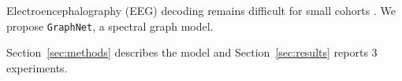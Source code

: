 Electroencephalography (EEG) decoding remains difficult for small cohorts \citep{smith2020}. We propose \texttt{GraphNet}, a spectral graph model.

Section~\ref{sec:methods} describes the model and Section~\ref{sec:results} reports 3 experiments.
